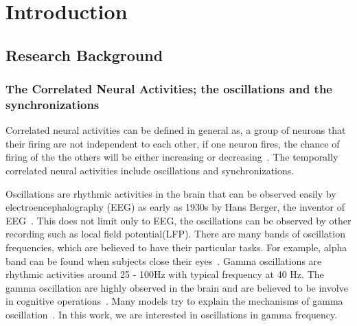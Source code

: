 \chapter{Introduction}




\section{Research Background	}
\subsection[The Correlated Neural Activities]{The Correlated Neural Activities; the oscillations and the synchronizations}

Correlated neural activities can be defined in general as, a group of neurons that their firing are not independent to each other, if one neuron fires, the chance of firing of the the others will be either increasing or decreasing~\cite{salinas2001correlated}. The temporally correlated neural activities include oscillations and synchronizations. 

Oscillations are rhythmic activities in the brain that can be observed easily by electroencephalography (EEG) as early as 1930s by Hans Berger, the inventor of EEG~\cite{haas2003hans}. This does not limit only to EEG, the oscillations can be observed by other recording such as local field potential(LFP). 
There are many bands of oscillation frequencies, which are believed to have their particular tasks. For example, alpha band can be found when subjects close their eyes~\cite{buzsaki2004neuronal}. Gamma oscillations are rhythmic activities around 25 - 100Hz with typical frequency at 40 Hz. The gamma oscillation are highly observed in the brain and are believed to be involve in cognitive operations~\cite{engel2001temporal, fries2005mechanism, singer1995visual}. Many models try to explain the mechanisms of gamma oscillation~\cite{brunel2003determines,buzsaki2012mechanisms,gray1996chattering,wang1996gamma,whittington1995synchronized, wilson1972excitatory}. In this work, we are interested in oscillations in gamma frequency.

